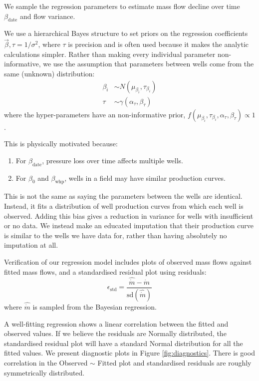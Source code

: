 \documentclass[a4paper, 12pt]{article}
\begin{document}
We sample the regression parameters to estimate mass flow decline over time $\beta_\text{date}$ and flow variance.

We use a hierarchical Bayes structure to set priors on the regression coefficients $\vec{\beta},\tau=1/\sigma^2$, where $\tau$ is precision and is often used because it makes the analytic calculations simpler. Rather than making every individual parameter non-informative, we use the assumption that parameters between wells come from the same (unknown) distribution:
\begin{align}
\beta_i &\sim N\left( \mu_{\beta_i},\tau_{\beta_i} \right)\\
\tau &\sim \gamma\left(\alpha_\tau,\beta_\tau\right)
\end{align}
where the hyper-parameters have an non-informative prior, $f\left(\mu_{\beta_i},\tau_{\beta_i},\alpha_\tau,\beta_\tau\right) \propto 1$.
 
This is physically motivated because:
\begin{enumerate}
\item For $\beta_\text{date}$, pressure loss over time affects multiple wells.
\item For $\beta_0$ and $\beta_\text{whp}$, wells in a field may have similar production curves.
\end{enumerate}
This is not the same as saying the parameters between the wells are identical. Instead, it fits a distribution of well production curves from which each well is observed. Adding this bias gives a reduction in variance for wells with insufficient or no data. We instead make an educated imputation that their production curve is similar to the wells we have data for, rather than having absolutely no imputation at all.

Verification of our regression model includes plots of observed mass flows against fitted mass flows, and a standardised residual plot using residuals:
\begin{equation}
\epsilon_\text{std} = \frac{\hat{\dot{m}} - \dot{m}}{\text{sd}\left( \hat{\dot{m}} \right)}
\end{equation}
where $\hat{\dot{m}}$ is sampled from the Bayesian regression.

A well-fitting regression shows a linear correlation between the fitted and observed values. If we believe the residuals are Normally distributed, the standardised residual plot will have a standard Normal distribution for all the fitted values. We present diagnostic plots in Figure \ref{fig:diagnostics}. There is good correlation in the Observed $\sim$ Fitted plot and standardised residuals are roughly symmetrically distributed. %
\end{document}
